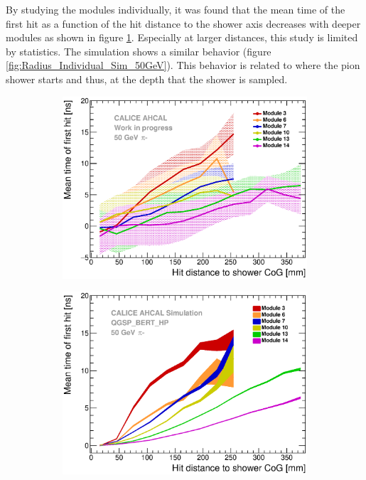 \documentclass{JINST}
\begin{document}
By studying the modules individually, it was found that the mean time of the first hit as a function of the hit distance to the shower axis decreases with deeper modules as shown in figure \ref{fig:Radius_Individual_Data_50GeV}. Especially at larger distances, this study is limited by statistics. The simulation shows a similar behavior (figure \ref{fig:Radius_Individual_Sim_50GeV}). This behavior is related to where the pion shower starts and thus, at the depth that the shower is sampled.

\begin{figure}[htbp!]
  \begin{subfigure}[t]{0.49\textwidth}
    \centering
    \includegraphics[width=1\textwidth]{fig/Timing_Radius_Comparison_ShortAsymRange_IndividualLayers.eps}
    \caption{} \label{fig:Radius_Individual_Data_50GeV}
  \end{subfigure}
  \hfill
  \begin{subfigure}[t]{0.49\textwidth}
    \centering
    \includegraphics[width=1\textwidth]{fig/Timing_Radius_Comparison_ShortAsymRange_IndividualLayers_Sim.eps}

\end{subfigure}
\end{figure}
\end{document}
